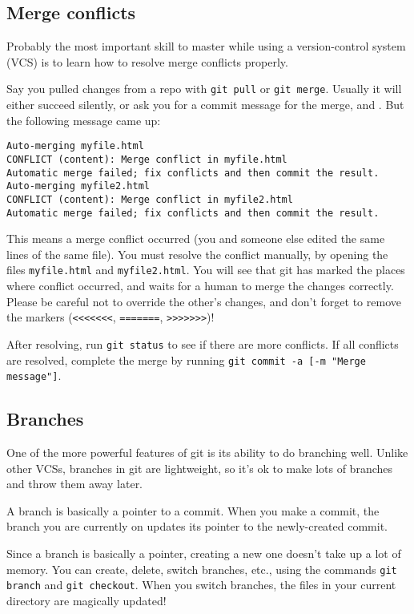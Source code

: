 \documentclass[12pt]{article}
\begin{document}
\subsection{Merge conflicts}
Probably the most important skill to master while using a version-control system (VCS) is to learn how to resolve merge conflicts properly.

Say you pulled changes from a repo with \texttt{git pull} or \texttt{git merge}. Usually it will either succeed silently, or ask you for a commit message for the merge, and . But the following message came up:

\texttt{Auto-merging myfile.html\\
CONFLICT (content): Merge conflict in myfile.html\\
Automatic merge failed; fix conflicts and then commit the result.\\
Auto-merging myfile2.html\\
CONFLICT (content): Merge conflict in myfile2.html\\
Automatic merge failed; fix conflicts and then commit the result.
}

This means a merge conflict occurred (you and someone else edited the same lines of the same file). You must resolve the conflict manually, by opening the files \texttt{myfile.html} and \texttt{myfile2.html}. You will see that git has marked the places where conflict occurred, and waits for a human to merge the changes correctly. Please be careful not to override the other's changes, and don't forget to remove the markers (\texttt{<<<<<<<}, \texttt{=======}, \texttt{>>>>>>>})!

After resolving, run \texttt{git status} to see if there are more conflicts. If all conflicts are resolved, complete the merge by running \texttt{git commit -a [-m "Merge message"]}.

\subsection{Branches}
One of the more powerful features of git is its ability to do branching well. Unlike other VCSs, branches in git are lightweight, so it's ok to make lots of branches and throw them away later.

A branch is basically a pointer to a commit. When you make a commit, the branch you are currently on updates its pointer to the newly-created commit.

Since a branch is basically a pointer, creating a new one doesn't take up a lot of memory. You can create, delete, switch branches, etc., using the commands \texttt{git branch} and \texttt{git checkout}. When you switch branches, the files in your current directory are magically updated!
\end{document}
